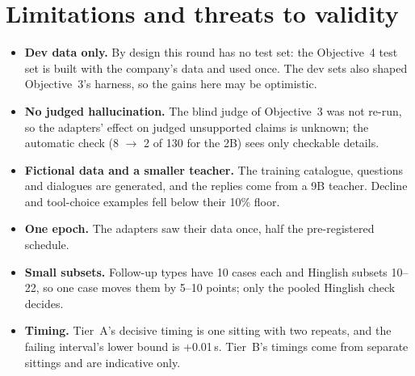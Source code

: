 \documentclass[11pt,a4paper]{article}
\begin{document}
\section{Limitations and threats to validity}\label{sec:limits}
\begin{itemize}
  \item \textbf{Dev data only.} By design this round has no test set: the Objective~4 test set is built with the company's
        data and used once. The dev sets also shaped Objective~3's harness, so the gains here may be optimistic.
  \item \textbf{No judged hallucination.} The blind judge of Objective~3 was not re-run, so the adapters' effect on
        judged unsupported claims is unknown; the automatic check (8 $\to$ 2 of 130 for the 2B) sees only checkable
        details.
  \item \textbf{Fictional data and a smaller teacher.} The training catalogue, questions and dialogues are generated, and
        the replies come from a 9B teacher. Decline and tool-choice examples fell below their 10\% floor.
  \item \textbf{One epoch.} The adapters saw their data once, half the pre-registered schedule.
  \item \textbf{Small subsets.} Follow-up types have 10 cases each and Hinglish subsets 10--22, so one case moves them by
        5--10 points; only the pooled Hinglish check decides.
  \item \textbf{Timing.} Tier~A's decisive timing is one sitting with two repeats, and the failing interval's lower bound
        is +0.01\,s. Tier~B's timings come from separate sittings and are indicative only.
\end{itemize}

\end{document}

